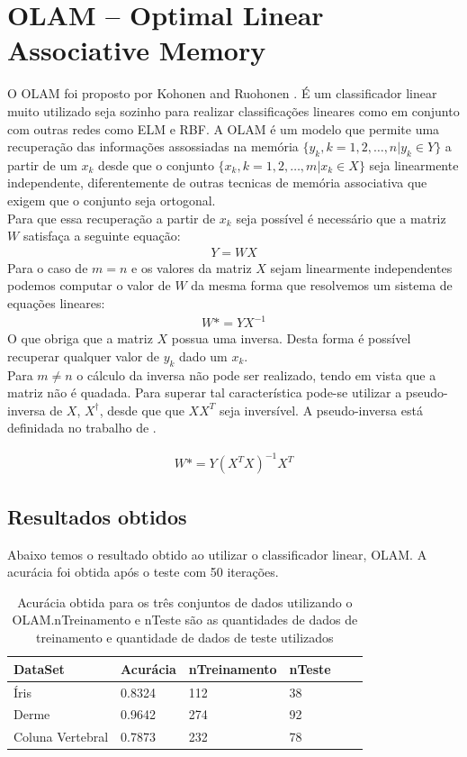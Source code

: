 \documentclass[
	article,			%
	11pt,				%
	oneside,			%
	a4paper,			%
	english,			%
	brazil,				%
	sumario=tradicional
	]{abntex2}
\begin{document}
\section*{OLAM – Optimal Linear Associative Memory} 
O OLAM foi proposto por
Kohonen and Ruohonen \cite{OLAM_1}. É um classificador linear muito utilizado
seja sozinho para realizar classificações lineares como em conjunto com outras
redes como ELM e RBF. A OLAM é um modelo que permite uma recuperação das
informações assossiadas na memória $\{y_k,k=1,2,\ldots,n|y_k\in Y\}$ a partir de
um $x_k$ desde que o conjunto $\{x_k,k=1,2,\ldots,m|x_k \in X\}$ seja
linearmente independente, diferentemente de outras tecnicas de memória
associativa que exigem que o conjunto seja ortogonal.\\
Para que essa recuperação a partir de $x_k$ seja possível é necessário que a
matriz $W$ satisfaça a seguinte equação:
\begin{align}
Y=WX
\end{align}
Para o caso de $m=n$ e os valores da matriz $X$ sejam linearmente independentes
podemos computar o valor de $W$ da mesma forma que resolvemos um sistema de
equações lineares:
\begin{align}
W*=YX^{-1}
\end{align}
O que obriga que a matriz $X$ possua uma inversa. Desta forma é possível
recuperar qualquer valor de $y_k$ dado um $x_k$.
\\
Para $m \neq n$ o cálculo da inversa não pode ser realizado, tendo em vista que
a matriz não é quadada. Para superar tal característica pode-se utilizar a
pseudo-inversa de $X$, $X^{\dagger}$, desde que que $XX^T$ seja inversível. A
pseudo-inversa está definidada no trabalho de \cite{penrose_1}.

\begin{align}
W*=Y(X^TX)^{-1}X^T
\end{align}
\subsection*{Resultados obtidos}
Abaixo temos o resultado obtido ao utilizar o classificador linear, OLAM.
A acurácia foi obtida após o teste com 50 iterações.

\begin{table}[h]
\centering
	\begin{tabular}{|l|l|l|l|l|l|}
	\hline
	DataSet          & Acurácia & nTreinamento & nTeste \\ \hline
	Íris             & 0.8324   & 112          & 38     \\\hline 
	Derme     		 & 0.9642   & 274          & 92     \\ \hline
	Coluna Vertebral & 0.7873   & 232          & 78     \\
	\hline
	\end{tabular}
	\caption{Acurácia obtida para os três conjuntos de dados utilizando o
	OLAM.nTreinamento e nTeste são as quantidades de dados de
	treinamento e quantidade de dados de teste utilizados}
\end{table}  
   
\end{document}
